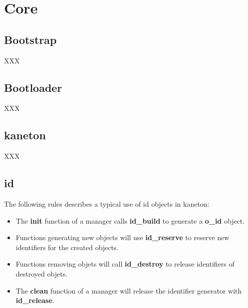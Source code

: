 
%
%

\chapter{Core}

%
%

\section{Bootstrap}

XXX

%
%

\section{Bootloader}

XXX

%
%

\section{kaneton}

XXX

%
%

\section{id}

The following rules describes a typical use of id objects in kaneton:

\begin{itemize}
  \item
    The \textbf{init} function of a manager calls \textbf{id\_build}
    to generate a \textbf{o\_id} object.
  \item
    Functions generating new objects will use \textbf{id\_reserve} to
    reserve new identifiers for the created objects.
  \item
    Functions removing objets will call \textbf{id\_destroy} to release
    identifiers of destroyed objets.
  \item
    The \textbf{clean} function of a manager will release the identifier
    generator with \textbf{id\_release}.
\end{itemize}
